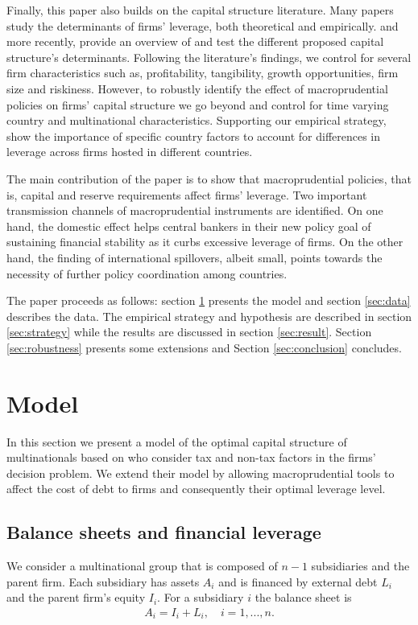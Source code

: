 \documentclass[12pt]{article}
\begin{document}
	Finally, this paper also builds on the capital structure literature. Many papers study the determinants of firms' leverage, both theoretical and empirically. \cite*{titman1988determinants} and more recently, \cite{oztekin2015capital} provide an overview of and test the different proposed capital structure's determinants. Following the literature's findings, we control for several firm characteristics such as, profitability, tangibility, growth opportunities, firm size and riskiness. However, to robustly  identify the effect of macroprudential policies on firms' capital structure we go beyond and control for time varying country and multinational characteristics. Supporting our empirical strategy, \cite*{booth2001capital} show the importance of specific country factors to account for differences in leverage across firms hosted in different countries. 
	
   The main contribution of the paper is to show that macroprudential policies, that is, capital and reserve requirements affect firms' leverage. Two important transmission channels of macroprudential instruments are identified. On one hand, the domestic effect helps central bankers in their new policy goal of sustaining financial stability as it curbs excessive leverage of firms. On the other hand, the finding of international spillovers, albeit small, points towards the necessity of further policy coordination among countries.        
	
	The paper proceeds as follows: section \ref{sec:model} presents the model and section \ref{sec:data} describes the data. The empirical strategy and hypothesis are described in section \ref{sec:strategy} while the results are discussed in section \ref{sec:result}. Section \ref{sec:robustness} presents some extensions and Section \ref{sec:conclusion} concludes. 
	
		\section{Model} \label{sec:model}
	In this section we present a model of the optimal capital structure of multinationals based on \cite{huizinga2008capital} who consider tax and non-tax factors in the firms' decision problem. We extend their model by allowing macroprudential tools to affect the cost of debt to firms and consequently their optimal leverage level.  
	\subsection{Balance sheets and financial leverage}
	\label{subsec:balancesheet}
	We consider a multinational group that is composed of $n-1$ subsidiaries and the parent firm. Each subsidiary has assets $A_i$ and is financed by external debt $L_i$ and the parent firm's equity $I_i$. For a subsidiary $i$ the balance sheet is
	\begin{equation}
	\begin{aligned}
	A_i=I_i+L_i, \quad i=1,...,n.
	\end{aligned}
	\label{eq:sub balance sheet}
	\end{equation}
	
\end{document}
